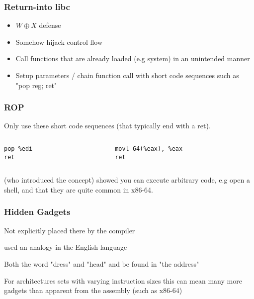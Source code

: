 \begin{frame}
	\frametitle{Return-into libc}

	\begin{itemize}
		\item $W \oplus X$ defense
		\item Somehow hijack control flow
		\item Call functions that are already loaded (e.g system) in an unintended manner
		\item Setup parameters / chain function call with short code sequences such as "pop reg; ret"
	\end{itemize}
\end{frame}

\begin{frame}[fragile]
	\frametitle{ROP}

	Only use these short code sequences (that typically end with a ret).

	\vspace{0.5cm}

	\begin{columns}
		\begin{column}{0.5\textwidth}
			\begin{lstlisting}[tabsize=2,frame=single,language={[x86masm]Assembler}]
pop %edi
ret
			\end{lstlisting}
		\end{column}

		\begin{column}{0.5\textwidth}
			\begin{lstlisting}[tabsize=2,frame=single,language={[x86masm]Assembler}]
movl 64(%eax), %eax
ret
			\end{lstlisting}
		\end{column}
	\end{columns}

	\vspace{0.5cm}

	\textcite{rop} (who introduced the concept) showed you can execute arbitrary code, e.g
	open a shell, and that they are quite common in x86-64.

\end{frame}

\begin{frame}
	\frametitle{Hidden Gadgets}
	Not explicitly placed there by the compiler

	\vspace{0.5cm}

	\textcite{rop} used an analogy in the English language

	\vspace{0.5cm}

	Both the word "dress" and "head" and be found in "the address"

	\vspace{0.5cm}

	For architectures sets with varying instruction sizes this can mean many more gadgets
	than apparent from the assembly (such as x86-64)

\end{frame}

